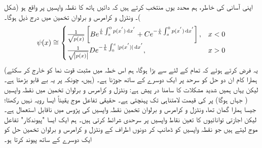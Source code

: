 اپنی آسانی کی خاطر، ہم محدد  یوں  منتخب  کرتے  ہیں کہ دائیں ہاتھ کا نقطہ واپسیں  پر واقع ہو (شکل )۔ ونٹزل و کرامرس و برلوان  تخمین میں درج ذیل ہوگا۔
\begin{align}\label{مساوات_وقب_تخمین}
	\psi (x) \cong
	\begin{cases}
		\frac{1}{\sqrt{p(x)}}\left[B e^{\frac{i}{h} \int^{0}_{x} p(x^{'}) \dif x^{'}} + C e^{- \frac{i}{h} \int^{0}_{x} p(x^{'}) \dif x^{'}}\right] ,& x < 0 \\
		\frac{1}{\sqrt{\abs{p(x)}}} D e^{- \frac{1}{h} \int^{x}_{0}|p(x^{'})| \dif x^{'}},& x> 0 
	\end{cases}
\end{align}
(یہ فرض کرتے ہوئے  کہ تمام  کے لئے   سے  بڑا ہوگا،  ہم اس خطہ میں مثبت قوت نما کو خارج کر سکتے ہیں،  چونکہ  پر  یہ بے قابو بڑھتا ہے۔)  ہمارا کام ان دو حل  کو سرحد پر ایک دوسرے کے ساتھ جوڑنا ہے۔ لیکن  یہاں ہمیں شدید مشکلات کا سامنا در پیش ہے: ونٹزل و کرامرس و برلوان  تخمین میں  نقطہ واپسیں ( جہاں  ہوگا)  پر   کی قیمت لامتناہی تک پہنچتی ہے۔ حقیقی تفاعل موج یقیناً ایسا رویہ نہیں رکھتا؛ جیسا ہمارا گمان تھا،   ونٹزل و کرامرس و برلوان  تخمین نقطہ واپسیں کی پڑوس میں ناقابل استعمال ہے۔ لیکن اجازتی توانائیوں کا تعین  نقاط واپسیں پر سرحدی شرائط  کرتی ہیں۔ ہم ایک ایسا  "پیوندکار" تفاعل موج لیتے ہیں جو نقطہ واپسیں کو ڈھانپ کر دونوں اطراف کے ونٹزل و کرامرس و برلوان  تخمین حل کو ایک دوسرے کے ساتھ پیوند کرتا ہو۔

